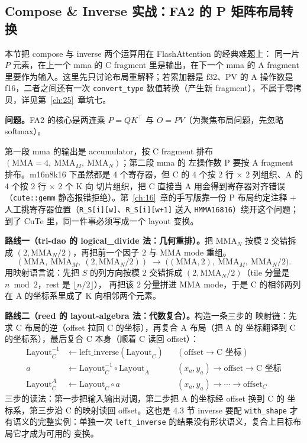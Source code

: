 \subsection{Compose \& Inverse 实战：FA2 的 P 矩阵布局转换}

本节把 compose 与 inverse 两个运算用在 FlashAttention 的经典难题上：
同一片 $P$ 元素，在上一个 mma 的 C fragment 里是输出，在下一个 mma 的
A fragment 里要作为输入。这里先只讨论布局重解释；若累加器是 f32、PV 的 A
操作数是 f16，二者之间还有一次 \texttt{convert\_type} 数值转换（产生新
fragment），不属于零拷贝，详见第~\ref{ch:25}~章坑七。

\textbf{问题。}\allowbreak{}FA2 的核心是两连乘 $P=QK^{\top}$ 与 $O=PV$（为聚焦布局问题，先忽略 softmax）。

第一段 mma 的输出是 accumulator，按 C fragment 排布
$(\mathrm{MMA}=4,\ \mathrm{MMA}_M,\ \mathrm{MMA}_N)$；第二段 mma 的
左操作数 P 要按 A fragment 排布。m16n8k16 下虽然都是 4 个寄存器，但 C 的
4 个按 2 行 $\times$ 2 列组织、A 的 4 个按 2 行 $\times$ 2 个 K 向
切片组织，把 C 直接当 A 用会得到寄存器对齐错误（\texttt{cute::gemm}
静态报错拒绝）。第~\ref{ch:16}~章的手写版靠一份 P 布局约定注释 $+$
人工挑寄存器位置（\texttt{R\_S[i][w]}、\texttt{R\_S[i][w+1]} 送入
\texttt{HMMA16816}）绕开这个问题；到了 CuTe 里，同一件事必须写成一个
layout 变换。

\textbf{路线一（tri-dao 的 logical\_divide 法：几何重排）。}把
$\mathrm{MMA}_N$ 按模 $2$ 交错拆成 $(2,\mathrm{MMA}_N/2)$，再把前一个因子
$2$ 与 MMA mode 重组。
\begin{equation}
  (\mathrm{MMA},\ \mathrm{MMA}_M,\ (2,\mathrm{MMA}_N/2))
  \;\longrightarrow\;
  \bigl((\mathrm{MMA},2),\ \mathrm{MMA}_M,\ \mathrm{MMA}_N/2\bigr) .
  \label{eq:20-fa2-tri}
\end{equation}
用映射语言说：先把 $S$ 的列方向按模 $2$ 交错拆成
$(2,\mathrm{MMA}_N/2)$（tile 分量是 $n\bmod 2$，rest 是 $\lfloor n/2\rfloor$），
再把该 $2$ 分量拼进 MMA mode，于是 C 的相邻两列在 A 的坐标系里成了
K 向相邻两个元素。

\textbf{路线二（reed 的 layout-algebra 法：代数复合）。}构造一条三步的
映射链：先求 C 布局的逆（offset 拉回 C 的坐标），再复合 A 布局（把 A 的
坐标翻译到 C 的坐标系），最后复合 C 本身（顺着 C 读回 offset）：
\begin{align}
  \mathrm{Layout}_C^{-1} &\leftarrow \mathrm{left\_inverse}(\mathrm{Layout}_C)
    && (\mathrm{offset} \to \text{C 坐标}) \label{eq:20-fa2-reed1} \\
  a &\leftarrow \mathrm{Layout}_C^{-1} \circ \mathrm{Layout}_A
    && (x_a,y_a) \to \mathrm{offset} \to \text{C 坐标} \label{eq:20-fa2-reed2} \\
  \mathrm{Layout}_C^{A} &\leftarrow \mathrm{Layout}_C \circ a
    && (x_a,y_a) \to \cdots \to \mathrm{offset}_C \label{eq:20-fa2-reed3}
\end{align}
三步的读法：第一步把输入输出对调，第二步把 A 的坐标经 offset 换到 C 的
坐标系，第三步沿 C 的映射读回 offset。这也是 4.3 节 inverse 要配
\texttt{with\_shape} 才有语义的完整实例：单独一次
\texttt{left\_\allowbreak{}inverse} 的结果没有形状语义，复合上目标布局它才成为可用的
变换。


